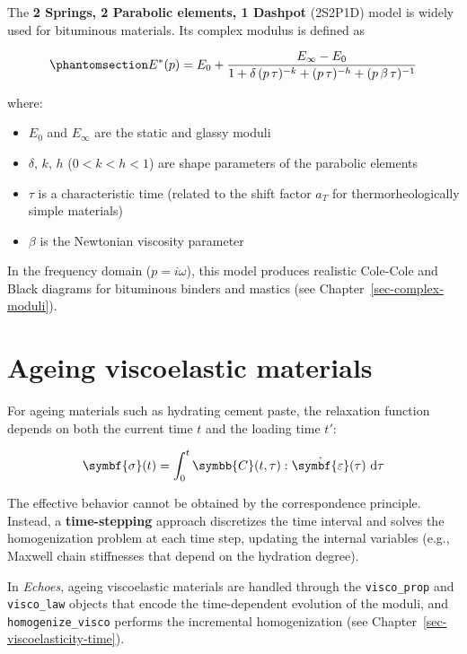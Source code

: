 \documentclass[
  a4paper,
  numbers=noendperiod,
  DIV=12]{scrreprt}
\providecommand{\tightlist}{%
  \setlength{\itemsep}{0pt}\setlength{\parskip}{0pt}}
\newcommand{\uu}[1]{{\symbf{{#1}}}}
\newcommand{\uuuu}[1]{{\symbb{{#1}}}}
\newcommand{\eps}{{\uu{{\varepsilon}}}}
\newcommand{\sig}{{\uu{{\sigma}}}}
\newcommand{\ud}{{\,\mathrm{d}}}
\begin{document}
The \textbf{2 Springs, 2 Parabolic elements, 1 Dashpot} (2S2P1D) model
is widely used for bituminous materials. Its complex modulus is defined
as

\begin{equation}\protect\phantomsection\label{eq-2S2P1D}{
E^*(p) = E_0 + \frac{E_\infty - E_0}{1 + \delta\,(p\,\tau)^{-k} + (p\,\tau)^{-h} + (p\,\beta\,\tau)^{-1}}
}\end{equation}

where:

\begin{itemize}
\tightlist
\item
  \(E_0\) and \(E_\infty\) are the static and glassy moduli
\item
  \(\delta\), \(k\), \(h\) (\(0 < k < h < 1\)) are shape parameters of
  the parabolic elements
\item
  \(\tau\) is a characteristic time (related to the shift factor \(a_T\)
  for thermorheologically simple materials)
\item
  \(\beta\) is the Newtonian viscosity parameter
\end{itemize}

In the frequency domain (\(p = i\omega\)), this model produces realistic
Cole-Cole and Black diagrams for bituminous binders and mastics (see
Chapter~\ref{sec-complex-moduli}).

\section{Ageing viscoelastic materials}\label{sec-ageing}

For ageing materials such as hydrating cement paste, the relaxation
function depends on both the current time \(t\) and the loading time
\(t'\):

\[
\sig(t) = \int_0^t \uuuu{C}(t,\tau) : \dot{\eps}(\tau) \, \ud\tau
\]

The effective behavior cannot be obtained by the correspondence
principle. Instead, a \textbf{time-stepping} approach discretizes the
time interval and solves the homogenization problem at each time step,
updating the internal variables (e.g., Maxwell chain stiffnesses that
depend on the hydration degree).

In \emph{Echoes}, ageing viscoelastic materials are handled through the
\texttt{visco\_prop} and \texttt{visco\_law} objects that encode the
time-dependent evolution of the moduli, and \texttt{homogenize\_visco}
performs the incremental homogenization (see
Chapter~\ref{sec-viscoelasticity-time}).
\end{document}
